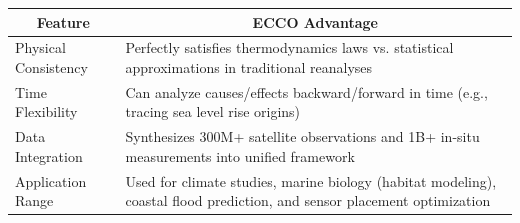 \begin{center}
\begin{tabular}{m{} m{}}
    \multicolumn{1}{c}{\textbf{Feature}} & \multicolumn{1}{c}{\textbf{ECCO Advantage}} \\ \hline
    Physical Consistency & Perfectly satisfies thermodynamics laws vs. statistical approximations in traditional reanalyses \\ \hline 
    Time Flexibility & Can analyze causes/effects backward/forward in time (e.g., tracing sea level rise origins) \\ \hline
    Data Integration & Synthesizes 300M+ satellite observations and 1B+ in-situ measurements into unified framework \\ \hline
    Application Range & Used for climate studies, marine biology (habitat modeling), coastal flood prediction, and sensor placement optimization \\ \hline
\end{tabular}
\end{center}

